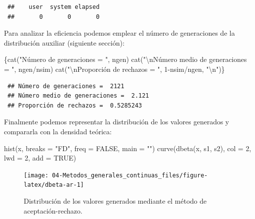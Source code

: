 \documentclass[
]{book}
\newenvironment{Shaded}{\begin{snugshade}}{\end{snugshade}}
\newcommand{\AttributeTok}[1]{\textcolor[rgb]{0.77,0.63,0.00}{#1}}
\newcommand{\ConstantTok}[1]{\textcolor[rgb]{0.00,0.00,0.00}{#1}}
\newcommand{\DecValTok}[1]{\textcolor[rgb]{0.00,0.00,0.81}{#1}}
\newcommand{\FunctionTok}[1]{\textcolor[rgb]{0.00,0.00,0.00}{#1}}
\newcommand{\NormalTok}[1]{#1}
\newcommand{\SpecialCharTok}[1]{\textcolor[rgb]{0.00,0.00,0.00}{#1}}
\newcommand{\StringTok}[1]{\textcolor[rgb]{0.31,0.60,0.02}{#1}}
\theoremstyle{break}
\theoremstyle{nonumberplain}
\begin{document}
\begin{verbatim}
 ##    user  system elapsed 
 ##       0       0       0
\end{verbatim}

Para analizar la eficiencia podemos emplear el número de generaciones de la distribución auxiliar (siguiente sección):

\begin{Shaded}
\begin{Highlighting}[]
\NormalTok{\{}\FunctionTok{cat}\NormalTok{(}\StringTok{"Número de generaciones = "}\NormalTok{, ngen)}
\FunctionTok{cat}\NormalTok{(}\StringTok{"}\SpecialCharTok{\textbackslash{}n}\StringTok{Número medio de generaciones = "}\NormalTok{, ngen}\SpecialCharTok{/}\NormalTok{nsim)}
\FunctionTok{cat}\NormalTok{(}\StringTok{"}\SpecialCharTok{\textbackslash{}n}\StringTok{Proporción de rechazos = "}\NormalTok{, }\DecValTok{1}\SpecialCharTok{{-}}\NormalTok{nsim}\SpecialCharTok{/}\NormalTok{ngen, }\StringTok{"}\SpecialCharTok{\textbackslash{}n}\StringTok{"}\NormalTok{)\}}
\end{Highlighting}
\end{Shaded}

\begin{verbatim}
 ## Número de generaciones =  2121
 ## Número medio de generaciones =  2.121
 ## Proporción de rechazos =  0.5285243
\end{verbatim}

Finalmente podemos representar la distribución de los valores generados y compararla con la densidad teórica:

\begin{Shaded}
\begin{Highlighting}[]
\FunctionTok{hist}\NormalTok{(x, }\AttributeTok{breaks =} \StringTok{"FD"}\NormalTok{, }\AttributeTok{freq =} \ConstantTok{FALSE}\NormalTok{, }\AttributeTok{main =} \StringTok{""}\NormalTok{)}
\FunctionTok{curve}\NormalTok{(}\FunctionTok{dbeta}\NormalTok{(x, s1, s2), }\AttributeTok{col =} \DecValTok{2}\NormalTok{, }\AttributeTok{lwd =} \DecValTok{2}\NormalTok{, }\AttributeTok{add =} \ConstantTok{TRUE}\NormalTok{)}
\end{Highlighting}
\end{Shaded}

\begin{figure}[!htb]

{\centering \texttt{[image: 04-Metodos\_generales\_continuas\_files/figure-latex/dbeta-ar-1]} 

}

\caption{Distribución de los valores generados mediante el método de aceptación-rechazo.}\label{fig:dbeta-ar}
\end{figure}
\end{document}
